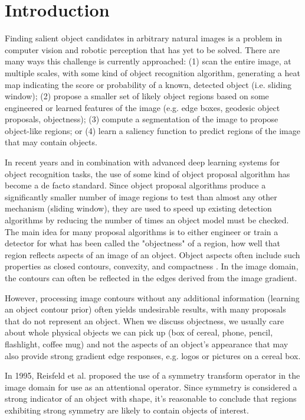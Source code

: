 \section{Introduction}
\label{sec:intro}
Finding salient object candidates in arbitrary natural images is a problem in computer vision and robotic perception that has yet to be solved. There are many ways this challenge is currently approached: (1) scan the entire image, at multiple scales, with some kind of object recognition algorithm, generating a heat map indicating the score or probability of a known, detected object (i.e. sliding window); (2) propose a smaller set of likely object regions based on some engineered or learned features of the image (e.g. edge boxes, geodesic object proposals, objectness); (3) compute a segmentation of the image to propose object-like regions; or (4) learn a saliency function to predict regions of the image that may contain objects.

In recent years and in combination with advanced deep learning systems for object recognition tasks, the use of some kind of object proposal algorithm has become a de facto standard. Since object proposal algorithms produce a significantly smaller number of image regions to test than almost any other mechanism (\eg sliding window), they are used to speed up existing detection algorithms by reducing the number of times an object model must be checked. The main idea for many proposal algorithms is to either engineer or train a detector for what has been called the "objectness" of a region, \ie how well that region reflects aspects of an image of an object. Object aspects often include such properties as closed contours, convexity, and compactness \cite{koffka_principles_1935}. In the image domain, the contours can often be reflected in the edges derived from the image gradient.

However, processing image contours without any additional information (\eg learning an object contour prior) often yields undesirable results, with many proposals that do not represent an object. When we discuss objectness, we usually care about whole physical objects we can pick up (box of cereal, phone, pencil, flashlight, coffee mug) and not the aspects of an object's appearance that may also provide strong gradient edge responses, e.g. logos or pictures on a cereal box.

In 1995, Reisfeld et al. proposed the use of a symmetry transform operator\cite{reisfeld_robust_1992} in the image domain for use as an attentional operator. Since symmetry is considered a strong indicator of an object with shape\cite{dickinson_symmetry_2013}, it's reasonable to conclude that regions exhibiting strong symmetry are likely to contain objects of interest.

